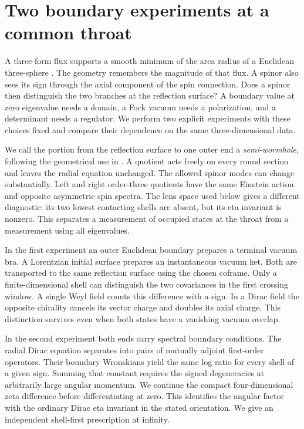 \section{Two boundary experiments at a common throat}
A three-form flux supports a smooth minimum of the area radius of a Euclidean three-sphere \cite{GS}. The geometry remembers the magnitude of that flux. A spinor also sees its sign through the axial component of the spin connection. Does a spinor then distinguish the two branches at the reflection surface? A boundary value at zero eigenvalue needs a domain, a Fock vacuum needs a polarization, and a determinant needs a regulator. We perform two explicit experiments with these choices fixed and compare their dependence on the same three-dimensional data.

We call the portion from the reflection surface to one outer end a \emph{semi-wormhole}, following the geometrical use in \cite{Kaul}. A quotient acts freely on every round section and leaves the radial equation unchanged. The allowed spinor modes can change substantially. Left and right order-three quotients have the same Einstein action and opposite asymmetric spin spectra. The lens space used below gives a different diagnostic: its two lowest contacting shells are absent, but its eta invariant is nonzero. This separates a measurement of occupied states at the throat from a measurement using all eigenvalues.

In the first experiment an outer Euclidean boundary prepares a terminal vacuum bra. A Lorentzian initial surface prepares an instantaneous vacuum ket. Both are transported to the same reflection surface using the chosen coframe. Only a finite-dimensional shell can distinguish the two covariances in the first crossing window. A single Weyl field counts this difference with a sign. In a Dirac field the opposite chirality cancels its vector charge and doubles its axial charge. This distinction survives even when both states have a vanishing vacuum overlap.

In the second experiment both ends carry spectral boundary conditions. The radial Dirac equation separates into pairs of mutually adjoint first-order operators. Their boundary Wronskians yield the same log ratio for every shell of a given sign. Summing that constant requires the signed degeneracies at arbitrarily large angular momentum. We continue the compact four-dimensional zeta difference before differentiating at zero. This identifies the angular factor with the ordinary Dirac eta invariant in the stated orientation. We give an independent shell-first prescription at infinity.

